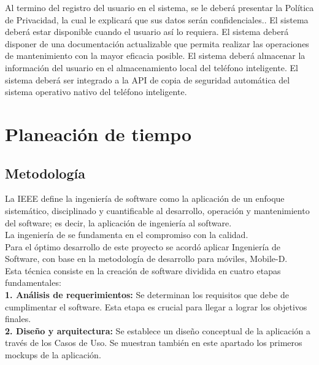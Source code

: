 \begin{NFRequieriments}
	{Al termino del registro del usuario en el sistema, se le deberá presentar la Política de Privacidad, la cual le explicará que sus datos serán confidenciales..}
	{El sistema deberá estar disponible cuando el usuario así lo requiera.}
	{El sistema deberá disponer de una documentación actualizable que permita realizar las operaciones de mantenimiento con la mayor eficacia posible.}
	{El sistema deberá almacenar la información del usuario en el almacenamiento local del teléfono inteligente.}
	{El sistema deberá ser integrado a la API de copia de seguridad automática del sistema operativo nativo del teléfono inteligente.}
\end{NFRequieriments}

\newpage 
\section{Planeación de tiempo}

\subsection{Metodología}
La IEEE define la ingeniería de software como la aplicación de un enfoque sistemático, disciplinado y cuantificable al desarrollo, operación y mantenimiento del software; es decir, la aplicación de ingeniería al software.\\ 

La ingeniería de se fundamenta en el compromiso con la calidad.\\

Para el óptimo desarrollo de este proyecto se acordó aplicar Ingeniería de Software, con base en la metodología de desarrollo para móviles, Mobile-D.\\

Esta técnica consiste en la creación de software dividida en cuatro etapas fundamentales:\\

\textbf{1. Análisis de requerimientos:} Se determinan los requisitos que debe de cumplimentar el software. Esta etapa es crucial para llegar a lograr los objetivos finales.\\

\textbf{2. Diseño y arquitectura:} Se establece un diseño conceptual de la aplicación a través de los Casos de Uso. Se muestran también en este apartado los primeros mockups de la aplicación.\\

